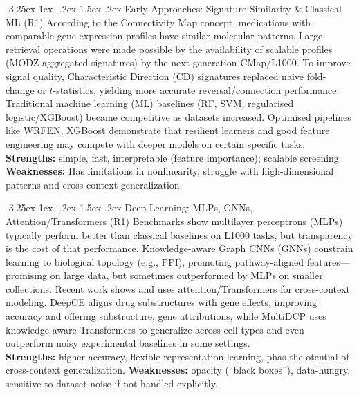 \documentclass[12pt,a4paper]{article}
\makeatletter
\renewcommand\subsection{\@startsection{subsection}{2}{\z@}%
  {-3.25ex\@plus-1ex \@minus-.2ex}%
  {1.5ex \@plus.2ex}%
  {\normalfont\normalsize\bfseries}}
\makeatother
\begin{document}
\subsection{Early Approaches: Signature Similarity \& Classical ML (R1)}
According to the Connectivity Map concept, medications with comparable gene-expression profiles have similar molecular patterns.  Large retrieval operations were made possible by the availability of scalable profiles (MODZ-aggregated signatures) by the next-generation CMap/L1000\cite{subramanian2017next}. To improve signal quality, Characteristic Direction (CD) signatures replaced naive fold-change or $t$-statistics, yielding more accurate reversal/connection performance\cite{duan2016l1000cds2}. Traditional machine learning (ML) baselines (RF, SVM, regularised logistic/XGBoost) became competitive as datasets increased. Optimised pipelines like WRFEN, XGBoost demonstrate that resilient learners and good feature engineering may compete with deeper models on certain specific tasks\cite{lu2021drug}.\\
\textbf{Strengths:} simple, fast, interpretable (feature importance); scalable screening.
\textbf{Weaknesses:} Has limitations in nonlinearity, struggle with high-dimensional patterns and cross-context generalization.

\subsection{Deep Learning: MLPs, GNNs, Attention/Transformers (R1)}
Benchmarks show multilayer perceptrons (MLPs) typically perform better than classical baselines on L1000 tasks, but transparency is the cost of that performance\cite{mcdermott2019deep}. Knowledge-aware Graph CNNs (GNNs) constrain learning to biological topology (e.g., PPI), promoting pathway-aligned features—promising on large data, but sometimes outperformed by MLPs on smaller collections\cite{mcdermott2019deep}. Recent work shows and uses attention/Transformers for cross-context modeling. DeepCE aligns drug substructures with gene effects, improving accuracy and offering substructure, gene attributions\cite{pham2021deep}, while MultiDCP uses knowledge-aware Transformers to generalize across cell types and even outperform noisy experimental baselines in some settings\cite{wu2022deep}.\\
\textbf{Strengths:} higher accuracy, flexible representation learning, phas the otential of cross-context generalization.
\textbf{Weaknesses:} opacity (\enquote{black boxes}), data-hungry, sensitive to dataset noise if not handled explicitly.
\end{document}
